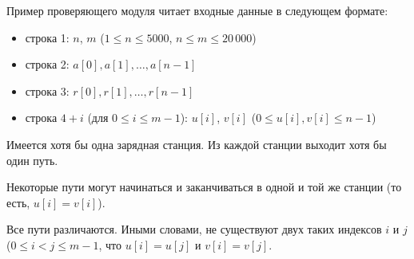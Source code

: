 Пример проверяющего модуля читает входные данные в следующем формате:
\begin{itemize}
\item строка 1: $n$, $m$ ($1 \leq n \leq 5000$, $n \leq m \leq 20\,000$)
\item строка 2: $a[0], a[1], \ldots, a[n - 1]$
\item строка 3: $r[0], r[1], \ldots, r[n - 1]$
\item строка $4 + i$ (для $0 \le i \le m - 1$): $u[i]$, $v[i]$ ($0 \le u[i], v[i] \le n - 1$)
\end{itemize}

Имеется хотя бы одна зарядная станция. Из каждой станции выходит хотя бы один путь.

Некоторые пути могут начинаться и заканчиваться в одной и той же станции (то есть, $u[i] = v[i]$).

Все пути различаются. Иными словами, не существуют двух таких индексов $i$ и $j$ ($0 \le i < j \le m - 1$, что $u[i] = u[j]$ и $v[i] = v[j]$.